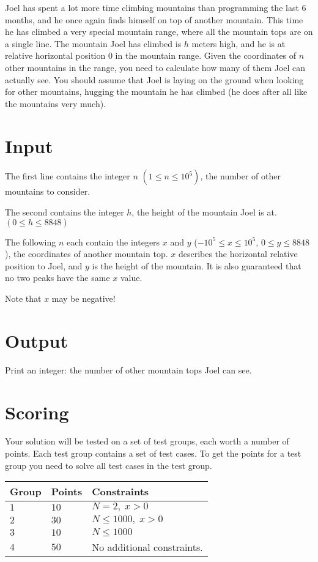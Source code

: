 \noindent

Joel has spent a lot more time climbing mountains than programming the last 6 months, and he once again finds himself on top of another mountain.
This time he has climbed a very special mountain range, where all the mountain tops are on a single line. 
The mountain Joel has climbed is $h$ meters high, and he is at relative horizontal position $0$ in the mountain range.
Given the coordinates of $n$ other mountains in the range, you need to calculate how many of them Joel can actually see.
You should assume that Joel is laying on the ground when looking for other mountains, hugging the mountain he has climbed (he does after all like the mountains very much).

\section*{Input}
The first line contains the integer $n$ $(1 \leq n \leq 10^{5})$, the number of other mountains to consider. 

The second contains the integer $h$, the height of the mountain Joel is at. $(0 \leq h \leq 8848)$

The following $n$ each contain the integers $x$ and $y$ ($-10^{5} \leq x \leq 10^{5}$, $0 \leq y \leq 8848$), the coordinates of another mountain top.
$x$ describes the horizontal relative position to Joel, and $y$ is the height of the mountain. It is also guaranteed that no two peaks have the same $x$ value.

Note that $x$ may be negative!

\section*{Output}
Print an integer: the number of other mountain tops Joel can see.

\section*{Scoring}
Your solution will be tested on a set of test groups, each worth a number of points. Each test group contains
a set of test cases. To get the points for a test group you need to solve all test cases in the test group.

\noindent
\begin{tabular}{| l | l | p{12cm} |}
  \hline
  \textbf{Group} & \textbf{Points} & \textbf{Constraints} \\ \hline
  $1$    & $10$       & $N = 2,\;x > 0$ \\ \hline
  $2$    & $30$       & $N \leq 1000,\;x > 0$ \\ \hline
  $3$    & $10$       & $N \leq 1000$ \\ \hline
  $4$    & $50$       & No additional constraints. \\ \hline
\end{tabular}

